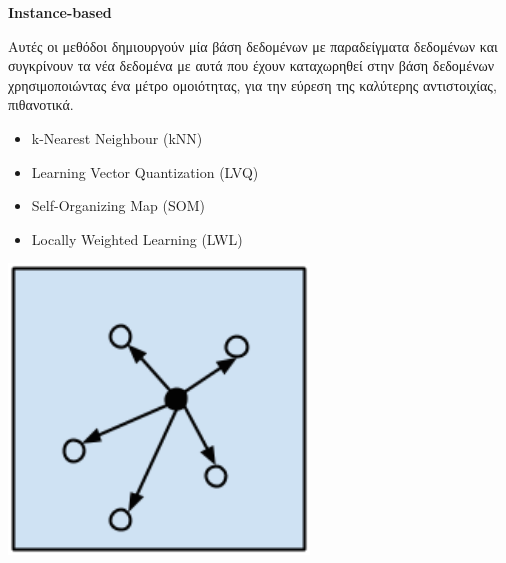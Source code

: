 \begin{minipage}{0.5\textwidth}

  \textbf{\large Instance-based}

  Αυτές οι μεθόδοι δημιουργούν μία βάση δεδομένων με
  παραδείγματα δεδομένων και συγκρίνουν τα νέα δεδομένα με αυτά που έχουν
  καταχωρηθεί στην βάση δεδομένων χρησιμοποιώντας ένα μέτρο ομοιότητας,
  για την εύρεση της καλύτερης αντιστοιχίας, πιθανοτικά.
  \begin{itemize}
    \setlength\itemsep{0em}
    \item{k-Nearest Neighbour (kNN)}
    \item{Learning Vector Quantization (LVQ)}
    \item{Self-Organizing Map (SOM)}
    \item{Locally Weighted Learning (LWL)}
  \end{itemize}
\end{minipage}
\begin{minipage}{0.5\textwidth}
  \begin{center}
    \includegraphics[width=0.6\textwidth]{./images/chapter3/instance_based_algorithms.png}
  \end{center}
\end{minipage}

